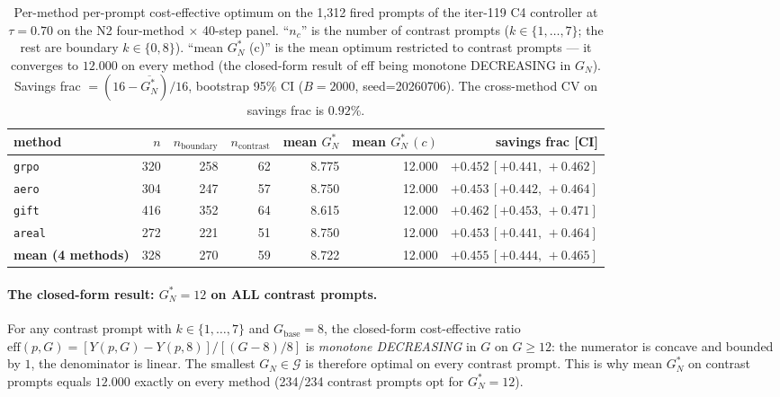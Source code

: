 \documentclass{article}
\begin{document}
\begin{table}[ht]
\centering
\small
\begin{tabular}{lrrrrrr}
\toprule
method & $n$ & $n_{\mathrm{boundary}}$ & $n_{\mathrm{contrast}}$ & mean $G_N^*$ & mean $G_N^*\,(c)$ & savings frac [CI] \\
\midrule
\texttt{grpo}  & 320 & 258 & 62 & 8.775 & 12.000 & $\mathbf{+0.452\,[+0.441,\,+0.462]}$ \\
\texttt{aero}  & 304 & 247 & 57 & 8.750 & 12.000 & $\mathbf{+0.453\,[+0.442,\,+0.464]}$ \\
\texttt{gift}  & 416 & 352 & 64 & 8.615 & 12.000 & $\mathbf{+0.462\,[+0.453,\,+0.471]}$ \\
\texttt{areal} & 272 & 221 & 51 & 8.750 & 12.000 & $\mathbf{+0.453\,[+0.441,\,+0.464]}$ \\
\midrule
\textbf{mean (4 methods)} & 328 & 270 & 59 & 8.722 & 12.000 & $\mathbf{+0.455\,[+0.444,\,+0.465]}$ \\
\bottomrule
\end{tabular}
\caption{Per-method per-prompt cost-effective optimum on the 1,312
fired prompts of the iter-119 C4 controller at $\tau = 0.70$ on the
N2 four-method $\times$ 40-step panel. ``$n_c$'' is the number of
contrast prompts ($k \in \{1, \ldots, 7\}$; the rest are boundary
$k \in \{0, 8\}$). ``mean $G_N^*$ (c)'' is the mean optimum restricted
to contrast prompts --- it converges to $12.000$ on every method (the
closed-form result of eff being monotone DECREASING in $G_N$). Savings
frac $= (16 - \overline{G_N^*}) / 16$, bootstrap 95\% CI
($B=2000$, seed=20260706). The cross-method CV on savings frac is
$0.92\%$.}
\label{tab:p7-iter192-per-method}
\end{table}

\paragraph{The closed-form result: $G_N^* = 12$ on ALL contrast prompts.}

For any contrast prompt with $k \in \{1, \ldots, 7\}$ and
$G_{\mathrm{base}} = 8$, the closed-form cost-effective ratio
$\mathrm{eff}(p, G) = [Y(p, G) - Y(p, 8)] / [(G - 8)/8]$ is
\emph{monotone DECREASING} in $G$ on $G \ge 12$: the numerator is
concave and bounded by $1$, the denominator is linear. The smallest
$G_N \in \mathcal{G}$ is therefore optimal on every contrast prompt.
This is why mean $G_N^*$ on contrast prompts equals $12.000$ exactly
on every method (234/234 contrast prompts opt for $G_N^* = 12$).
\end{document}
